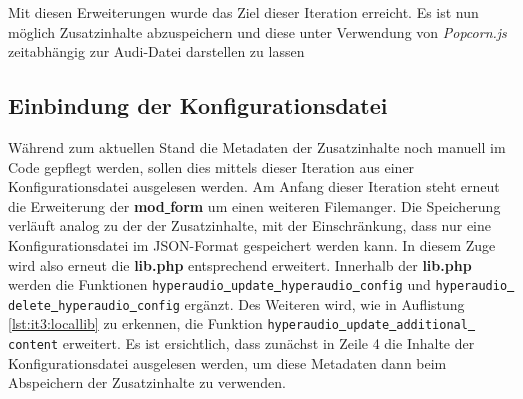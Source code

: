 Mit diesen Erweiterungen wurde das Ziel dieser Iteration erreicht. Es ist nun möglich Zusatzinhalte abzuspeichern und diese unter Verwendung von \textit{Popcorn.js} zeitabhängig zur Audi-Datei darstellen zu lassen

\subsection{Einbindung der Konfigurationsdatei}
Während zum aktuellen Stand die Metadaten der Zusatzinhalte noch manuell im Code gepflegt werden, sollen dies mittels dieser Iteration aus einer Konfigurationsdatei ausgelesen werden. Am Anfang dieser Iteration steht erneut die Erweiterung der \textbf{mod\underline{{ }}form} um einen weiteren Filemanger. Die Speicherung verläuft analog zu der der Zusatzinhalte, mit der Einschränkung, dass nur eine Konfigurationsdatei im JSON-Format gespeichert werden kann. In diesem Zuge wird also erneut die \textbf{lib.php} entsprechend erweitert. Innerhalb der \textbf{lib.php} werden die Funktionen \texttt{hyperaudio\underline{{ }}update\underline{{ }}hyperaudio\underline{{ }}config} und \texttt{hyperaudio\underline{{ }}delete\underline{{ }}hyperaudio\underline{{ }}config} ergänzt. Des Weiteren wird, wie in Auflistung \ref{lst:it3:locallib} zu erkennen, die Funktion \texttt{hyperaudio\underline{{ }}update\underline{{ }}additional\underline{{ }}content} erweitert. Es ist ersichtlich, dass zunächst in Zeile 4 die Inhalte der Konfigurationsdatei ausgelesen werden, um diese Metadaten dann beim Abspeichern der Zusatzinhalte zu verwenden.


